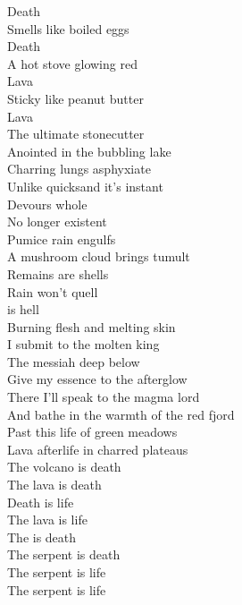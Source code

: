 


Death\\
Smells like boiled eggs\\
Death\\
A hot stove glowing red\\
Lava\\
Sticky like peanut butter\\
Lava\\
The ultimate stonecutter\\

Anointed in the bubbling lake\\
Charring lungs asphyxiate\\
Unlike quicksand it's instant\\
Devours whole\\
No longer existent\\
Pumice rain engulfs\\
A mushroom cloud brings tumult\\
Remains are shells\\
Rain won't quell\\
 is hell\\

Burning flesh and melting skin\\
I submit to the molten king\\
The messiah deep below\\
Give my essence to the afterglow\\
There I'll speak to the magma lord\\
And bathe in the warmth of the red fjord\\
Past this life of green meadows\\
Lava afterlife in charred plateaus\\

The volcano is death\\
The lava is death\\
Death is life\\
The lava is life\\

The  is death\\
The serpent is death\\
The serpent is life\\
The serpent is life\\

